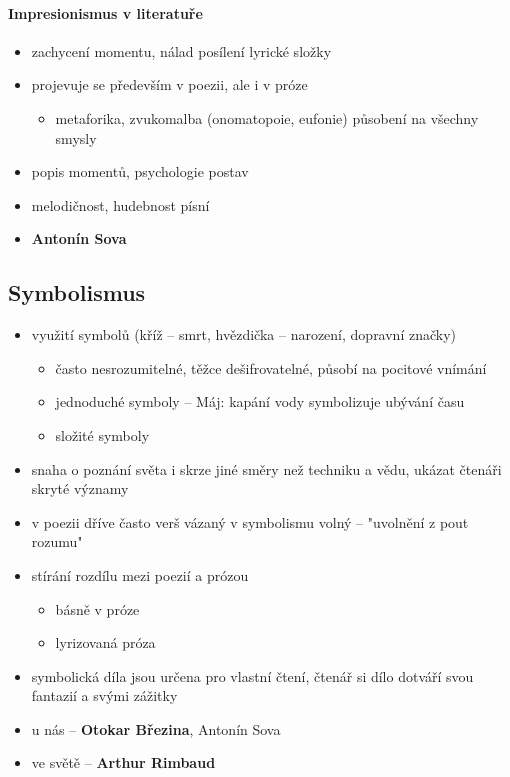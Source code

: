 \paragraph{Impresionismus v literatuře}
\begin{itemize}
\item zachycení momentu, nálad \ra posílení lyrické složky 
\item projevuje se především v poezii, ale i v próze
	\begin{itemize}
	\item metaforika, zvukomalba (onomatopoie, eufonie) \ra působení na všechny smysly
	\end{itemize}
\item popis momentů, psychologie postav
\item melodičnost, hudebnost písní
\item \textbf{Antonín Sova}
\end{itemize}



\subsection{Symbolismus}
\begin{itemize}
\item využití symbolů (kříž -- smrt, hvězdička -- narození, dopravní značky)
	\begin{itemize}
	\item často nesrozumitelné, těžce dešifrovatelné, působí na pocitové vnímání
	\item jednoduché symboly -- Máj: kapání vody symbolizuje ubývání času
	\item složité symboly
	\end{itemize}
\item snaha o poznání světa i skrze jiné směry než techniku a vědu, ukázat čtenáři skryté významy
\item v poezii  dříve často verš vázaný \ra v symbolismu volný -- "uvolnění z pout rozumu"
\item stírání rozdílu mezi poezií a prózou
	\begin{itemize}
	\item[\ra] básně v próze
	\item[\ra] lyrizovaná próza
	\end{itemize}
\item symbolická díla jsou určena pro vlastní čtení, čtenář si dílo dotváří svou fantazií a svými zážitky
\item u nás -- \textbf{Otokar Březina}, Antonín Sova
\item ve světě -- \textbf{Arthur Rimbaud}
\end{itemize}


